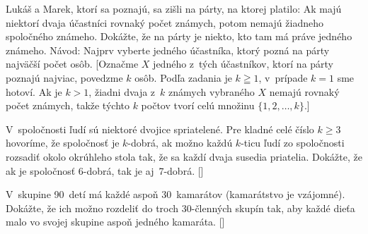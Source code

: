{Lukáš a Marek, ktorí sa poznajú, sa zišli na párty, na ktorej platilo:
Ak majú niektorí dvaja účastníci rovnaký počet známych,
potom nemajú žiadneho spoločného známeho. Dokážte, že na párty je niekto,
kto tam má práve jedného známeho. Návod: Najprv vyberte jedného
účastníka, ktorý pozná na párty najväčší počet osôb.
[Označme $X$ jedného z~tých účastníkov, ktorí na párty poznajú
najviac, povedzme $k$ osôb. Podľa zadania je $k\geqq1$, v~prípade
$k=1$ sme hotoví. Ak je $k>1$, žiadni dvaja z~$k$ známych vybraného
$X$ nemajú rovnaký počet známych, takže týchto $k$ počtov
tvorí celú množinu $\{1,2,\dots,k\}$.]

V~spoločnosti ľudí sú niektoré dvojice spriatelené. Pre
kladné celé číslo $k\ge 3$ hovoríme, že spoločnosť je $k$-dobrá, ak
možno každú $k$-ticu ľudí zo spoločnosti rozsadiť okolo okrúhleho stola
tak, že sa každí dvaja susedia priatelia. Dokážte, že ak je spoločnosť
6-dobrá, tak je aj~7-dobrá.
[]

V~skupine 90~detí má každé aspoň 30~kamarátov (kamarátstvo je vzájomné). Dokážte, že ich možno rozdeliť do troch 30-členných skupín tak, aby každé dieťa malo vo svojej skupine aspoň jedného kamaráta.
[]


}


